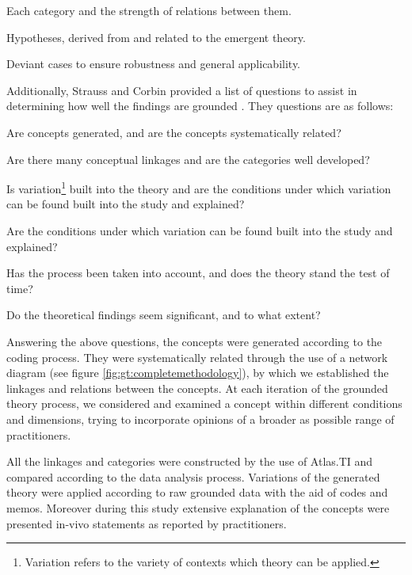 \documentclass[10pt,journal,letterpaper,compsoc]{IEEEtran}
\begin{document}
\par\vspace {0.4cm}
\begin{compactitem}
\item Each category and the strength of relations between them.
\item Hypotheses, derived from and related to the emergent theory.
\item Deviant cases to ensure robustness and general applicability.
\end{compactitem}
\par\vspace {0.4cm}

Additionally, Strauss and Corbin provided a list of questions to assist in determining how well the findings are grounded \cite{Strauss1998}. They questions are as follows:

\par\vspace {0.4cm}
\begin{compactenum}
\item Are concepts generated, and are the concepts systematically related?
\item Are there many conceptual linkages and are the categories well developed?
\item Is variation\footnote{Variation refers to the variety of contexts which theory can be applied.} built into the theory and are the conditions under which variation can be found built into the study and explained?
\item Are the conditions under which variation can be found built into the study and explained?
\item Has the process been taken into account, and does the theory stand the test of time?
\item Do the theoretical findings seem significant, and to what extent?
\end{compactenum}
\par\vspace {0.4cm}

Answering the above questions, the concepts were generated according to the coding process. They were systematically related through the use of a network diagram (see figure \ref{fig:gt:completemethodology}), by which we established the linkages and relations between the concepts. At each iteration of the grounded theory process, we considered and examined a concept within different conditions and dimensions, trying to incorporate opinions of a broader as possible range of practitioners. 

All the linkages and categories were constructed by the use of Atlas.TI and compared according to the data analysis process. Variations of the generated theory were applied according to raw grounded data with the aid of codes and memos. Moreover during this study extensive explanation of the concepts were presented in-vivo statements as reported by practitioners. 
\end{document}
